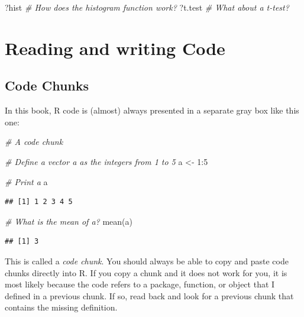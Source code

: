 \documentclass[
]{book}
\newenvironment{Shaded}{\begin{snugshade}}{\end{snugshade}}
\newcommand{\CommentTok}[1]{\textcolor[rgb]{0.56,0.35,0.01}{\textit{#1}}}
\newcommand{\DecValTok}[1]{\textcolor[rgb]{0.00,0.00,0.81}{#1}}
\newcommand{\FunctionTok}[1]{\textcolor[rgb]{0.00,0.00,0.00}{#1}}
\newcommand{\NormalTok}[1]{#1}
\newcommand{\OtherTok}[1]{\textcolor[rgb]{0.56,0.35,0.01}{#1}}
\newcommand{\SpecialCharTok}[1]{\textcolor[rgb]{0.00,0.00,0.00}{#1}}
\begin{document}
\begin{Shaded}
\begin{Highlighting}[]
\NormalTok{?hist   }\CommentTok{\# How does the histogram function work?}
\NormalTok{?t.test }\CommentTok{\# What about a t{-}test?}
\end{Highlighting}
\end{Shaded}

\hypertarget{INSTALL-READ-WRITE-CODE}{%
\section{Reading and writing Code}\label{INSTALL-READ-WRITE-CODE}}

\hypertarget{code-chunks}{%
\subsection{Code Chunks}\label{code-chunks}}

In this book, R code is (almost) always presented in a separate gray box like this one:

\begin{Shaded}
\begin{Highlighting}[]
\CommentTok{\# A code chunk}

\CommentTok{\# Define a vector a as the integers from 1 to 5}
\NormalTok{a }\OtherTok{\textless{}{-}} \DecValTok{1}\SpecialCharTok{:}\DecValTok{5}

\CommentTok{\# Print a}
\NormalTok{a}
\end{Highlighting}
\end{Shaded}

\begin{verbatim}
## [1] 1 2 3 4 5
\end{verbatim}

\begin{Shaded}
\begin{Highlighting}[]
\CommentTok{\# What is the mean of a?}
\FunctionTok{mean}\NormalTok{(a)}
\end{Highlighting}
\end{Shaded}

\begin{verbatim}
## [1] 3
\end{verbatim}

This is called a \emph{code chunk}. You should always be able to copy and paste code chunks directly into R. If you copy a chunk and it does not work for you, it is most likely because the code refers to a package, function, or object that I defined in a previous chunk. If so, read back and look for a previous chunk that contains the missing definition.
\end{document}
